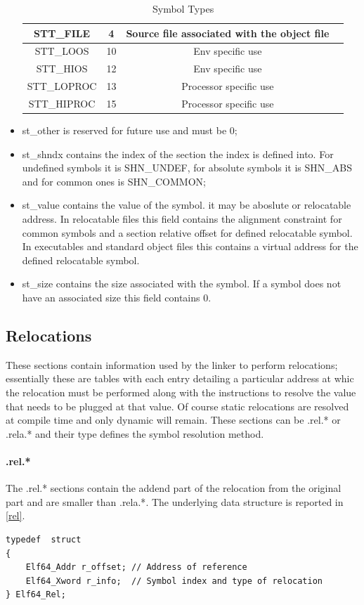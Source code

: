 \begin{itemize}
\begin{table}[!htbp]
\begin{center}
\begin{tabular}{|c|c|c|c|}
        \hline {\ttfamily STT\_FILE} & 4 & Source file associated with the object file\\
        \hline {\ttfamily STT\_LOOS} & 10 & Env specific use\\
        \hline {\ttfamily STT\_HIOS} & 12 & Env specific use\\
        \hline {\ttfamily STT\_LOPROC} & 13 & Processor specific use\\
        \hline {\ttfamily STT\_HIPROC} & 15 & Processor specific use\\
        \hline 
    \end{tabular}
\caption{Symbol Types}
\label{types}
\end{center} 
\end{table}
\item {\ttfamily st\_other} is reserved for future use and must be 0; \item {\ttfamily st\_shndx}
    contains the index of the section the index is defined into. For undefined symbols it is {\ttfamily
SHN\_UNDEF}, for absolute symbols it is {\ttfamily SHN\_ABS} and for common ones is {\ttfamily
SHN\_COMMON}; \item {\ttfamily st\_value} contains the value of the symbol. it may be aboslute or
relocatable address. In relocatable files this field contains the alignment constraint for common
symbols and a section relative offset for defined relocatable symbol. In executables and standard object
files this contains a virtual address for the defined relocatable symbol.  \item {\ttfamily st\_size} contains
the size associated with the symbol. If a symbol does not have an associated size this field contains 0.
\end{itemize}
\subsection{Relocations} These sections contain information used by the linker to perform relocations; essentially these are tables with each entry detailing a particular address at whic the relocation must be performed along with the instructions to resolve the value that needs to be plugged at that value. Of course static relocations are resolved at compile time and only dynamic will remain. These sections can be {\ttfamily .rel.*} or {\ttfamily .rela.*} and their type defines the symbol resolution method.
\paragraph{.rel.*} The {\ttfamily .rel.*} sections contain the addend part of the relocation from the original part and are smaller than {\ttfamily .rela.*}. The underlying data structure is reported in \ref{rel}.
\begin{lstlisting}[style=ansic, caption={.rel.* entries}, label=rel]
typedef  struct
{
    Elf64_Addr r_offset; // Address of reference
    Elf64_Xword r_info;  // Symbol index and type of relocation
} Elf64_Rel;
\end{lstlisting}
